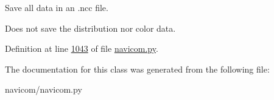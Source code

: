 Save all data in an .ncc file. 

Does not save the distribution nor color data. 

Definition at line \hyperlink{navicom_8py_source_l01043}{1043} of file \hyperlink{navicom_8py_source}{navicom.py}.



The documentation for this class was generated from the following file:\begin{DoxyCompactItemize}
\item 
navicom/navicom.py\end{DoxyCompactItemize}
